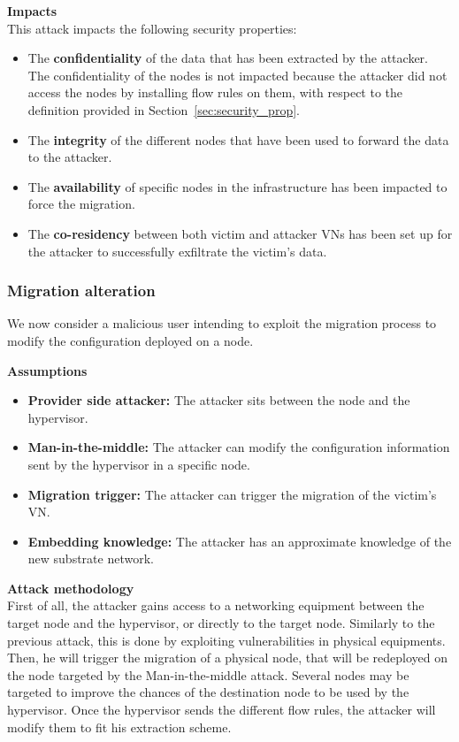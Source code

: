 \textbf{Impacts}\textbf{\\}
This attack impacts the following security properties:
\begin{itemize}
    \item The \textbf{confidentiality} of the data that has been extracted by the attacker.
The confidentiality of the nodes is not impacted because the attacker did not access the nodes by installing flow rules on them, with respect to the definition provided in Section~\ref{sec:security_prop}.

    \item The \textbf{integrity} of the different nodes that have been used to forward the data to the attacker.
    
    \item The \textbf{availability} of specific nodes in the infrastructure has been impacted to force the migration.
    
    \item The \textbf{co-residency} between both victim and attacker VNs has been set up for the attacker to successfully exfiltrate the victim's data.
\end{itemize}

\subsubsection{Migration alteration}
We now consider a malicious user intending to exploit the migration process to modify the configuration deployed on a node.

\textbf{Assumptions}
\begin{itemize}
    \item \textbf{Provider side attacker:} The attacker sits between the node and the hypervisor.
    \item \textbf{Man-in-the-middle:} The attacker can modify the configuration information sent by the hypervisor in a specific node.
    \item \textbf{Migration trigger:} The attacker can trigger the migration of the victim's VN.
    \item \textbf{Embedding knowledge:} The attacker has an approximate knowledge of the new substrate network.
\end{itemize}

\textbf{Attack methodology}\textbf{\\}
First of all, the attacker gains access to a networking equipment between the target node and the hypervisor, or directly to the target node. Similarly to the previous attack, this is done by exploiting vulnerabilities in physical equipments.
Then, he will trigger the migration of a physical node, that will be redeployed on the node targeted by the Man-in-the-middle attack. Several nodes may be targeted to improve the chances of the destination node to be used by the hypervisor.
Once the hypervisor sends the different flow rules, the attacker will modify them to fit his extraction scheme.

